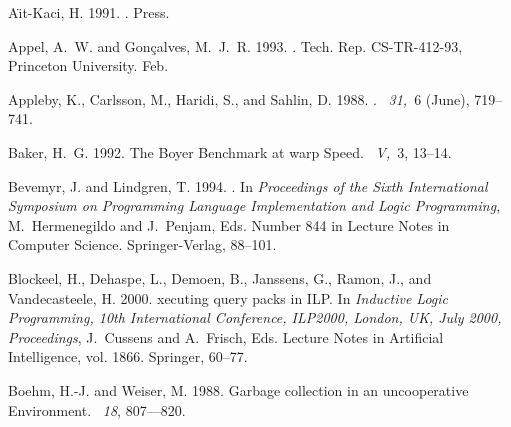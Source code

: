 \documentclass{tlp}
\begin{document}
\begin{thebibliography}{}

{\sc A{\"\i}t-Kaci, H.} 1991.
.
 {P}ress.

{\sc Appel, A.~W.} {\sc and} {\sc Gon{\c c}alves, M.~J.~R.} 1993.
.
\newblock Tech. Rep. CS-TR-412-93, Princeton University. Feb.

{\sc Appleby, K.}, {\sc Carlsson, M.}, {\sc Haridi, S.}, {\sc and} {\sc Sahlin,
  D.} 1988.
.
~{\em 31,\/}~6 (June), 719--741.

{\sc Baker, H.~G.} 1992.
\newblock The {B}oyer {B}enchmark at warp {S}peed.
~{\em V,\/}~3, 13--14.

{\sc Bevemyr, J.} {\sc and} {\sc Lindgren, T.} 1994.
.
\newblock In {\em Proceedings of the Sixth International Symposium on
  Programming Language Implementation and Logic Programming}, {M.~Hermenegildo}
  {and} {J.~Penjam}, Eds. Number 844 in Lecture Notes in Computer Science.
  Springer-Verlag, 88--101.

{\sc Blockeel, H.}, {\sc Dehaspe, L.}, {\sc Demoen, B.}, {\sc Janssens, G.},
  {\sc Ramon, J.}, {\sc and} {\sc Vandecasteele, H.} 2000.
xecuting query packs in {ILP}.
\newblock In {\em Inductive Logic Programming, 10th International Conference,
  ILP2000, London, UK, July 2000, Proceedings}, {J.~Cussens} {and} {A.~Frisch},
  Eds. Lecture Notes in Artificial Intelligence, vol. 1866. Springer, 60--77.

{\sc Boehm, H.-J.} {\sc and} {\sc Weiser, M.} 1988.
\newblock Garbage collection in an uncooperative {E}nvironment.
~{\em 18}, 807--–820.


\end{thebibliography}
\end{document}

